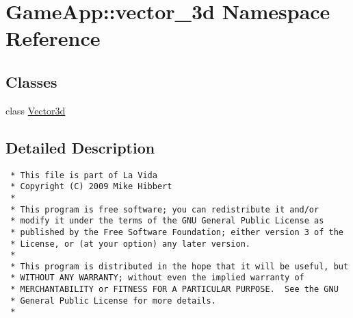 \hypertarget{namespaceGameApp_1_1vector__3d}{
\section{GameApp::vector\_\-3d Namespace Reference}
\label{namespaceGameApp_1_1vector__3d}
}


\subsection*{Classes}
\begin{CompactItemize}
\item 
class \hyperlink{classGameApp_1_1vector__3d_1_1Vector3d}{Vector3d}
\end{CompactItemize}


\subsection{Detailed Description}


\footnotesize\begin{verbatim}
 * This file is part of La Vida
 * Copyright (C) 2009 Mike Hibbert
 *
 * This program is free software; you can redistribute it and/or
 * modify it under the terms of the GNU General Public License as
 * published by the Free Software Foundation; either version 3 of the
 * License, or (at your option) any later version.
 *
 * This program is distributed in the hope that it will be useful, but
 * WITHOUT ANY WARRANTY; without even the implied warranty of
 * MERCHANTABILITY or FITNESS FOR A PARTICULAR PURPOSE.  See the GNU
 * General Public License for more details.
 *
\end{verbatim}
\normalsize
 